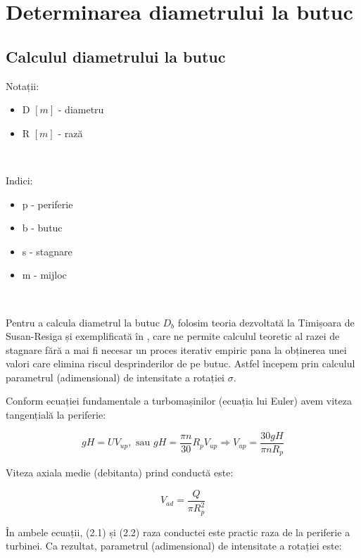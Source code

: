 \chapter{Determinarea diametrului la butuc}\label{chapter:butuc}

\section{Calculul diametrului la butuc}

Notații:
\begin{itemize}
    \item D $[m]$ - diametru
    \item R $[m]$ - rază
\end{itemize}

\

\noindent
Indici:
\begin{itemize}
    \item p - periferie
    \item b - butuc
    \item s - stagnare
    \item m - mijloc
\end{itemize}

\

Pentru a calcula diametrul la butuc $D_b$ folosim teoria dezvoltată la Timișoara de Susan-Resiga și exemplificată în \cite{susanhub}, care ne permite calculul teoretic al razei de stagnare fără a mai fi necesar un proces iterativ empiric pana la obținerea unei valori care elimina riscul desprinderilor de pe butuc. Astfel începem prin calculul parametrul (adimensional) de intensitate a rotației $\sigma$.

Conform ecuației fundamentale a turbomașinilor (ecuația lui Euler) avem viteza tangențială la periferie:

\begin{equation}
gH=UV_{up}, \text{ sau } gH=\frac{\pi n}{30} R_{p} V_{up} \Rightarrow V_{up}=\frac{30gH}{\pi n R_{p}}
\end{equation}

Viteza axiala medie (debitanta) prind conductă este:

\begin{equation}
V_{ad}=\frac{Q}{\pi R_{p}^2}
\end{equation}

În ambele ecuații, (2.1) și (2.2) raza conductei este practic raza de la periferie a turbinei. Ca rezultat, parametrul (adimensional) de intensitate a rotației este:

